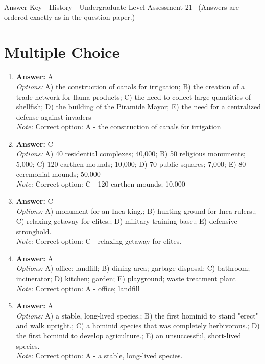\documentclass[12pt]{article}
\begin{document}
\begin{center}
Answer Key - History - Undergraduate Level Assessment 21 \
\small (Answers are ordered exactly as in the question paper.)
\end{center}

\section*{Multiple Choice}
\begin{enumerate}[label=\arabic*.]
\item \textbf{Answer:} A
\\ \textit{Options:} A) the construction of canals for irrigation; B) the creation of a trade network for llama products; C) the need to collect large quantities of shellfish; D) the building of the Piramide Mayor; E) the need for a centralized defense against invaders
\\ \textit{Note:} Correct option: A - the construction of canals for irrigation
\item \textbf{Answer:} C
\\ \textit{Options:} A) 40 residential complexes; 40,000; B) 50 religious monuments; 5,000; C) 120 earthen mounds; 10,000; D) 70 public squares; 7,000; E) 80 ceremonial mounds; 50,000
\\ \textit{Note:} Correct option: C - 120 earthen mounds; 10,000
\item \textbf{Answer:} C
\\ \textit{Options:} A) monument for an Inca king.; B) hunting ground for Inca rulers.; C) relaxing getaway for elites.; D) military training base.; E) defensive stronghold.
\\ \textit{Note:} Correct option: C - relaxing getaway for elites.
\item \textbf{Answer:} A
\\ \textit{Options:} A) office; landfill; B) dining area; garbage disposal; C) bathroom; incinerator; D) kitchen; garden; E) playground; waste treatment plant
\\ \textit{Note:} Correct option: A - office; landfill
\item \textbf{Answer:} A
\\ \textit{Options:} A) a stable, long-lived species.; B) the first hominid to stand "erect" and walk upright.; C) a hominid species that was completely herbivorous.; D) the first hominid to develop agriculture.; E) an unsuccessful, short-lived species.
\\ \textit{Note:} Correct option: A - a stable, long-lived species.
\end{enumerate}
\end{document}

